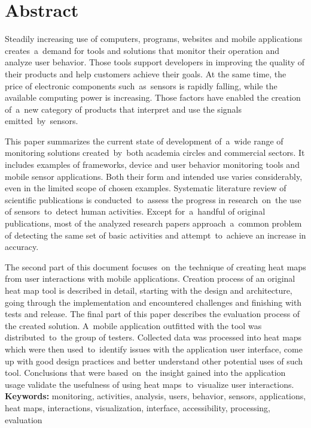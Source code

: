 \chapter*{Abstract}
Steadily increasing use of computers, programs, websites and mobile applications creates~a~demand for tools and solutions that monitor their operation and analyze user behavior. Those tools support developers in improving the quality of their products and help customers achieve their goals. At the same time, the price of electronic components such~as~sensors is rapidly falling, while the available computing power is increasing. Those factors have enabled the creation of~a~new category of products that interpret and use the signals emitted~by~sensors.

This paper summarizes the current state of development of~a~wide range of monitoring solutions created~by~both academia circles and commercial sectors. It includes examples of frameworks, device and user behavior monitoring tools and mobile sensor applications. Both their form and intended use varies considerably, even in the limited scope of chosen examples. Systematic literature review of scientific publications is conducted~to~assess the progress in research~on~the use of sensors~to~detect human activities. Except for~a~handful of original publications, most of the analyzed research papers approach~a~common problem of detecting the same set of basic activities and attempt~to~achieve an increase in accuracy.

The second part of this document focuses~on~the technique of creating heat maps from user interactions with mobile applications. Creation process of an original heat map tool is described in detail, starting with the design and architecture, going through the implementation and encountered challenges and finishing with tests and release. The final part of this paper describes the evaluation process of the created solution. A~mobile application outfitted with the tool was distributed~to~the group of testers. Collected data was processed into heat maps which were then used~to~identify issues with the application user interface, come up with good design practices and better understand other potential uses of such tool. Conclusions that were based~on~the insight gained into the application usage validate the usefulness of using heat maps~to~visualize user interactions. \\

\noindent\textbf{Keywords:} monitoring, activities, analysis, users, behavior, sensors, applications, heat maps, interactions, visualization, interface, accessibility, processing, evaluation
